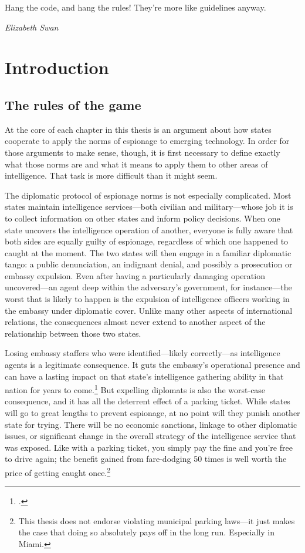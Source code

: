 \documentclass{memoir}
\begin{document}
\begin{refsegment}
\epigraph{Hang the code, and hang the rules! They're more like guidelines anyway.}{\emph{Elizabeth Swan}}
\section{Introduction}
\subsection{The rules of the game}
At the core of each chapter in this thesis is an argument about how states cooperate to apply the norms of espionage to emerging technology. In order for those arguments to make sense, though, it is first necessary to define exactly what those norms are and what it means to apply them to other areas of intelligence. That task is more difficult than it might seem.

The diplomatic protocol of espionage norms is not especially complicated. Most states maintain intelligence services---both civilian and military---whose job it is to collect information on other states and inform policy decisions. When one state uncovers the intelligence operation of another, everyone is fully aware that both sides are equally guilty of espionage, regardless of which one happened to caught at the moment. The two states will then engage in a familiar diplomatic tango: a public denunciation, an indignant denial, and possibly a prosecution or embassy expulsion. Even after having a particularly damaging operation uncovered---an agent deep within the adversary's government, for instance---the worst that is likely to happen is the expulsion of intelligence officers working in the embassy under diplomatic cover. Unlike many other aspects of international relations, the consequences almost never extend to another aspect of the relationship between those two states.

Losing embassy staffers who were identified---likely correctly---as intelligence agents is a legitimate consequence. It guts the embassy's operational presence and can have a lasting impact on that state's intelligence gathering ability in that nation for years to come.\footcite{macintyre_spy_2018} But expelling diplomats is also the worst-case consequence, and it has all the deterrent effect of a parking ticket. While states will go to great lengths to prevent espionage, at no point will they punish another state for trying. There will be no economic sanctions, linkage to other diplomatic issues, or significant change in the overall strategy of the intelligence service that was exposed. Like with a parking ticket, you simply pay the fine and you're free to drive again; the benefit gained from fare-dodging 50 times is well worth the price of getting caught once.\footnote{This thesis does not endorse violating municipal parking laws---it just makes the case that doing so absolutely pays off in the long run. Especially in Miami.}


\end{refsegment}
\end{document}
